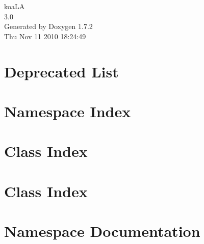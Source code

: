 \documentclass[a4paper]{book}
\begin{document}
\hypersetup{pageanchor=false}
\begin{titlepage}
\vspace*{7cm}
\begin{center}
{\Large koaLA \\[1ex]\large 3.0 }\\
\vspace*{1cm}
{\large Generated by Doxygen 1.7.2}\\
\vspace*{0.5cm}
{\small Thu Nov 11 2010 18:24:49}\\
\end{center}
\end{titlepage}
\clearemptydoublepage
{}
\tableofcontents
\clearemptydoublepage
{}
\hypersetup{pageanchor=true}
\chapter{Deprecated List}
\label{deprecated}
\hypertarget{deprecated}{}

\chapter{Namespace Index}

\chapter{Class Index}

\chapter{Class Index}

\chapter{Namespace Documentation}


\end{document}
